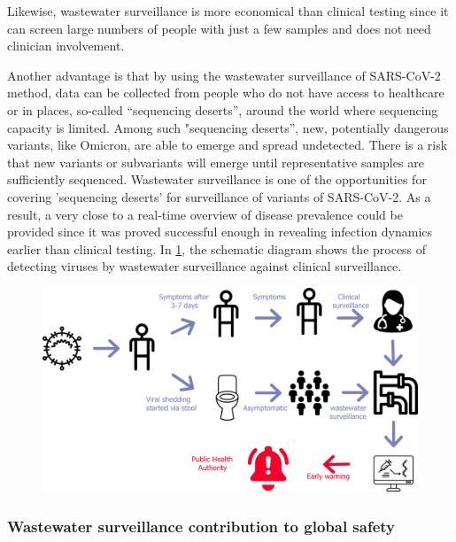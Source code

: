         Likewise, wastewater surveillance is more economical than clinical testing since it can screen large numbers of people with just a few samples and does not need clinician involvement.
        
        Another advantage is that by using the wastewater surveillance of SARS-CoV-2 method, data can be collected from people who do not have access to healthcare or in places, so-called “sequencing deserts”, around the world where sequencing capacity is limited. Among such "sequencing deserts'', new, potentially dangerous variants, like Omicron, are able to emerge and spread undetected. There is a risk that new variants or subvariants will emerge until representative samples are sufficiently sequenced. Wastewater surveillance is one of the opportunities for covering 'sequencing deserts' for surveillance of variants of SARS-CoV-2. As a result, a very close to a real-time overview of disease prevalence could be provided since it was proved \cite{zhang2021} successful enough in revealing infection dynamics earlier than clinical testing. In \cref{fig:intro:ww-process}, the schematic diagram shows the process of detecting viruses by wastewater surveillance against clinical surveillance. 
        \begin{figure}[ht!]
        	\centering
            \includegraphics[width=1\textwidth]{figures/intro/ww-process-v2.png}
            \label{fig:intro:ww-process}
        \end{figure}

        \subsubsection{Wastewater surveillance contribution to global safety} 
        
